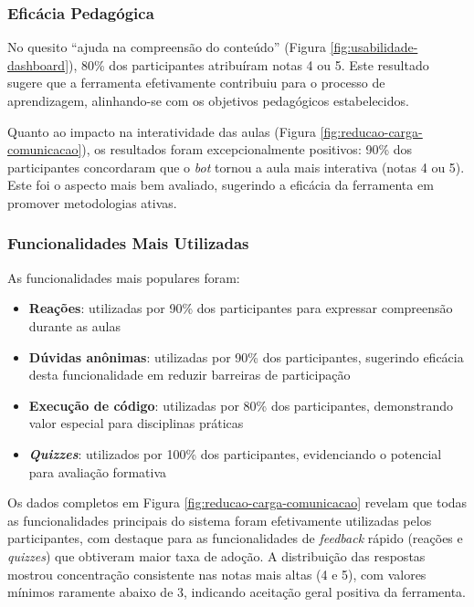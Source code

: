 \subsubsection{Eficácia Pedagógica}
\label{subsec:eficacia-pedagogica}

No quesito ``ajuda na compreensão do conteúdo'' (Figura
\ref{fig:usabilidade-dashboard}), 80\% dos participantes atribuíram notas 4 ou
5. Este resultado sugere que a ferramenta efetivamente contribuiu para o
processo de aprendizagem, alinhando-se com os objetivos pedagógicos
estabelecidos.

Quanto ao impacto na interatividade das aulas (Figura
\ref{fig:reducao-carga-comunicacao}), os resultados foram excepcionalmente
positivos: 90\% dos participantes concordaram que o \textit{bot} tornou a aula
mais interativa (notas 4 ou 5). Este foi o aspecto mais bem avaliado, sugerindo
a eficácia da ferramenta em promover metodologias ativas.

\subsubsection{Funcionalidades Mais Utilizadas}
\label{subsec:funcionalidades-mais-utilizadas}

As funcionalidades mais populares foram:

\begin{itemize}
\item \textbf{Reações}: utilizadas por 90\% dos participantes para expressar
compreensão durante as aulas
\item \textbf{Dúvidas anônimas}: utilizadas por 90\% dos participantes,
sugerindo eficácia desta funcionalidade em reduzir barreiras de participação
\item \textbf{Execução de código}: utilizadas por 80\% dos participantes,
demonstrando valor especial para disciplinas práticas
\item \textbf{\textit{Quizzes}}: utilizados por 100\% dos participantes,
evidenciando o potencial para avaliação formativa
\end{itemize}

Os dados completos em Figura \ref{fig:reducao-carga-comunicacao} revelam que
todas as funcionalidades principais do sistema foram efetivamente utilizadas
pelos participantes, com destaque para as funcionalidades de \textit{feedback}
rápido (reações e \textit{quizzes}) que obtiveram maior taxa de adoção. A
distribuição das respostas mostrou concentração consistente nas notas mais altas
(4 e 5), com valores mínimos raramente abaixo de 3, indicando aceitação geral
positiva da ferramenta.

